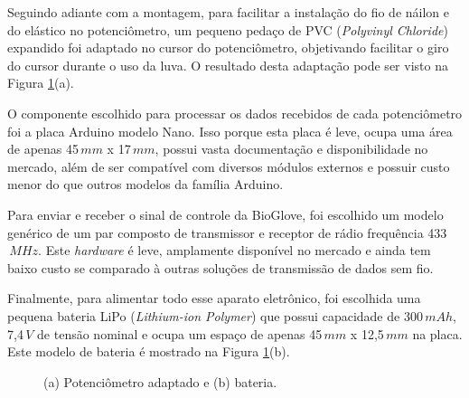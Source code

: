 \documentclass[
	12pt,				%
	openright,			%
	oneside,			%
	a4paper,			%
	english,			%
	brazil				%
	]{abntex2}
\begin{document}
			Seguindo adiante com a montagem, para facilitar a instalação do fio de náilon e do elástico no potenciômetro, um pequeno pedaço de PVC (\textit{Polyvinyl Chloride}) expandido foi adaptado no cursor do potenciômetro, objetivando facilitar o giro do cursor durante o uso da luva. O resultado desta adaptação pode ser visto na Figura \ref{Fig:potentiometer-and-battery}(a).

			O componente escolhido para processar os dados recebidos de cada potenciômetro foi a placa Arduino modelo Nano. Isso porque esta placa é leve, ocupa uma área de apenas 45$\,mm$ x 17$\,mm$, possui vasta documentação e disponibilidade no mercado, além de ser compatível com diversos módulos externos e possuir custo menor do que outros modelos da família Arduino.

			Para enviar e receber o sinal de controle da BioGlove, foi escolhido um modelo genérico de um par composto de transmissor e receptor de rádio frequência 433$\,MHz$. Este \textit{hardware} é leve, amplamente disponível no mercado e ainda tem baixo custo se comparado à outras soluções de transmissão de dados sem fio.

			Finalmente, para alimentar todo esse aparato eletrônico, foi escolhida uma pequena bateria LiPo (\textit{Lithium-ion Polymer}) que possui capacidade de 300$\,mAh$, 7,4$\,V$ de tensão nominal e ocupa um espaço de apenas 45$\,mm$ x 12,5$\,mm$ na placa. Este modelo de bateria é mostrado na Figura \ref{Fig:potentiometer-and-battery}(b).


	\begin{figure}[!htb]
		 \centering
		 \caption{ (a) Potenciômetro adaptado e (b) bateria.}
		 \centering
		 \label{Fig:potentiometer-and-battery}
	 \end{figure}
\end{document}
